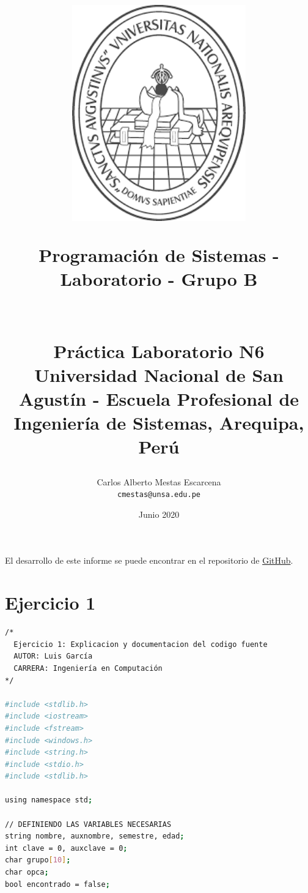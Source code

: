 \documentclass[12pt]{article}
\title{
\centerline{
    \includegraphics[width=75mm]{unsa.png}}
    \vspace{0.5 cm}
        Programación de Sistemas - Laboratorio - Grupo B
        \\
        \\
        \\
        \textbf{Práctica Laboratorio N6} 
        \large  
        \\
        \small Universidad Nacional de San Agustín - Escuela Profesional de Ingeniería de Sistemas, Arequipa, Perú 
  }
\author{
    Carlos Alberto Mestas Escarcena
    \\
    \texttt{cmestas@unsa.edu.pe}
}
\date{Junio 2020}
\begin{document}
\maketitle

El desarrollo de este informe se puede encontrar en el repositorio de \textcolor{blue}{
    \href{https://github.com/CarlosMestas/TC_A_6_Carlos_Mestas}{GitHub}}.
    
\section{Ejercicio 1}

\begin{lstlisting}[language=bash,frame=single,style=CStyle]
/*
  Ejercicio 1: Explicacion y documentacion del codigo fuente
  AUTOR: Luis García
  CARRERA: Ingeniería en Computación
*/

#include <stdlib.h>
#include <iostream>
#include <fstream>
#include <windows.h>
#include <string.h>
#include <stdio.h>
#include <stdlib.h>

using namespace std;

// DEFINIENDO LAS VARIABLES NECESARIAS
string nombre, auxnombre, semestre, edad;
int clave = 0, auxclave = 0;
char grupo[10];
char opca;
bool encontrado = false;


\end{lstlisting}
\end{document}
